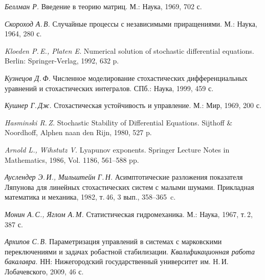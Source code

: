 \begin{thebibliography}{wlab}
\emph{Беллман Р.}
\newblock Введение в теорию матриц.
\newblock М.: Наука, 1969, 702 с.


\emph{Скороход А.\,В.}
\newblock Случайные процессы с независимыми приращениями.
\newblock М.: Наука, 1964, 280 с.

\emph{Kloeden P.\,E., Platen E.}
\newblock Numerical solution of stochastic differential equations.
\newblock Berlin: Springer-Verlag, 1992, 632 p.

\emph{Кузнецов Д.\,Ф.}
\newblock Численное моделирование стохастических дифференциальных уравнений и стохастических интегралов.
\newblock СПб.: Наука, 1999, 459 с.

\emph{Кушнер Г.\,Дж.}
\newblock Стохастическая устойчивость и управление.
\newblock М.: Мир, 1969, 200 с.

\emph{Hasminski R.\,Z.}
\newblock Stochastic Stability of Differential Equations.
\newblock Sijthoff \& Noordhoff, Alphen naan den Rijn, 1980, 527 p.

\emph{Arnold L., Wihstutz V.}
\newblock Lyapunov exponents.
\newblock Springer Lecture Notes in Mathematics, 1986, Vol. 1186, 561--588 pp.

\emph{Ауслендер Э.\,И., Мильштейн Г.\,Н.}
\newblock Асимптотические разложения показателя Ляпунова для линейных стохастических систем с малыми шумами.
\newblock Прикладная математика и механика, 1982, т.\,46, 3 вып., 358--365~c.


\emph{Монин А.\,С., Яглом А.\,М.}
\newblock Статистическая гидромеханика.
\newblock М.: Наука, 1967, т.\,2, 387 с.

\emph{Архипов С.\,В.}
\newblock Параметризация управлений в системах с марковскими переключениями и задачах робастной стабилизации.
\newblock \emph{Квалификационная работа бакалавра}.
\newblock НН: Нижегородский государственный университет им. Н.\,И.\,Лобачевского, 2009, 46 с.

\end{thebibliography}
